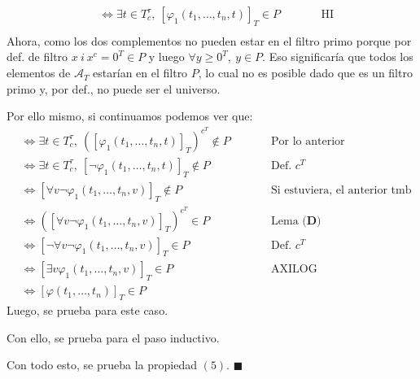 \documentclass{article}
\begin{document}
\begin{enumerate}
\begin{itemize}
\begin{itemize}
\begin{equation*}
\begin{alignedat}{2}
                                                                                         & \iff\exists t\in T^\tau_c,\ [\varphi_1(t_1,\dots,t_n,t)]_T\in P                                        &  & \qquad\text{HI}          \\
                          \end{alignedat}
                        \end{equation*}
                        Ahora, como los dos complementos no pueden estar en el filtro primo porque por def. de filtro $x\ i\ x^c=0^T\in P$ y luego $\forall y\geq 0^T,\ y\in P$. Eso significaría que todos los elementos de $\mathcal{A}_T$ estarían en el filtro $P$, lo cual no es posible dado que es un filtro primo y, por def., no puede ser el universo.

                        Por ello mismo, si continuamos podemos ver que:
                        \begin{equation*}
                          \begin{alignedat}{2}
                             & \iff\exists t\in T^\tau_c,\ ([\varphi_1(t_1,\dots,t_n,t)]_T)^{c^T}\notin P &  & \qquad\text{Por lo anterior}               \\
                             & \iff\exists t\in T^\tau_c,\ [\neg\varphi_1(t_1,\dots,t_n,t)]_T\notin P     &  & \qquad\text{Def. }c^T                      \\
                             & \iff [\forall v\neg\varphi_1(t_1,\dots,t_n,v)]_T\notin P                   &  & \qquad\text{Si estuviera, el anterior tmb} \\
                             & \iff ([\forall v\neg\varphi_1(t_1,\dots,t_n,v)]_T)^{c^T}\in P              &  & \qquad\text{Lema }\textbf{(D)}             \\
                             & \iff [\neg\forall v\neg\varphi_1(t_1,\dots,t_n,v)]_T\in P                  &  & \qquad\text{Def. }c^T                      \\
                             & \iff [\exists v\varphi_1(t_1,\dots,t_n,v)]_T\in P                          &  & \qquad\text{AXILOG}                        \\
                             & \iff [\varphi(t_1,\dots,t_n)]_T\in P
                          \end{alignedat}
                        \end{equation*}
                        Luego, se prueba para este caso.
                \end{itemize}
                Con ello, se prueba para el paso inductivo.
        \end{itemize}
        Con todo esto, se prueba la propiedad $(5)$. $\blacksquare$
\end{enumerate}
\end{document}
